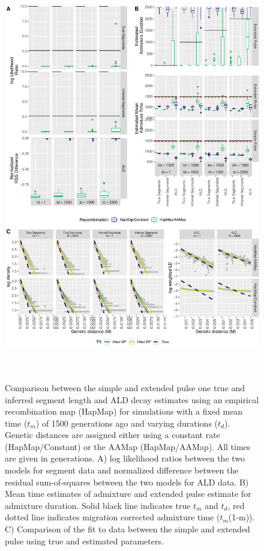 \documentclass[11pt]{article}
\begin{document}
\begin{figure}
\centering
\includegraphics[width=16cm,height=18cm,keepaspectratio]{ATE_Revisions_files/figure-latex/figResult2_all_together_Supplements-1.pdf}
\caption{\label{fig:figResult2_sup} Comparison between the simple and extended pulse one true and inferred segment length and ALD decay estimates using an empirical recombination map (HapMap) for simulations with a fixed mean time ($t_m$) of 1500 generations ago and varying durations ($t_d$). Genetic distances are assigned either using a constant rate (HapMap/Constant) or the AAMap (HapMap/AAMap). All times are given in generations. A) log likelihood ratios between the two models for segment data and normalized difference between the residual sum-of-squares between the two models for ALD data. B) Mean time estimates of admixture and extended pulse estimate for admixture duration. Solid black line indicates true $t_m$ and $t_d$, red dotted line indicates migration corrected admixture time ($t_m$(1-m)). C) Comparison of the fit to data between the simple and extended pulse using true and estimated parameters. }
\end{figure}
\end{document}
